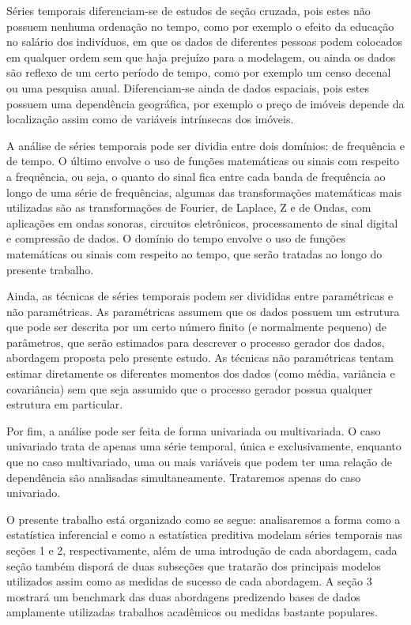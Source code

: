 \documentclass[twocolumn]{rbef}
\newcommand{\1}{\mathbbm{1}}
\begin{document}
Séries temporais diferenciam-se de estudos de seção cruzada, pois estes não possuem nenhuma ordenação no tempo, como por exemplo o efeito da educação no salário dos indivíduos, em que os dados de diferentes pessoas podem colocados em qualquer ordem sem que haja prejuízo para a modelagem, ou ainda os dados são reflexo de um certo período de tempo, como por exemplo um censo decenal ou uma pesquisa anual. Diferenciam-se ainda de dados espaciais, pois estes possuem uma dependência geográfica, por exemplo o preço de imóveis depende da localização assim como de variáveis intrínsecas dos imóveis.

A análise de séries temporais pode ser dividia entre dois domínios: de frequência e de tempo. O último envolve o uso de funções matemáticas  ou sinais com respeito a frequência, ou seja, o quanto do sinal fica entre cada banda de frequência ao longo de uma série de frequências, algumas das transformações matemáticas mais utilizadas são as transformações de Fourier, de Laplace, Z e de Ondas, com aplicações em ondas sonoras, circuitos eletrônicos, processamento de sinal digital e compressão de dados. O domínio do tempo envolve o uso de funções matemáticas ou sinais com respeito ao tempo, que serão tratadas ao longo do presente trabalho.

Ainda, as técnicas de séries temporais podem ser divididas entre paramétricas e não paramétricas. As paramétricas assumem que os dados possuem um estrutura que pode ser descrita por um certo número finito (e normalmente pequeno) de parâmetros, que serão estimados para descrever o processo gerador dos dados, abordagem proposta pelo presente estudo. As técnicas não paramétricas tentam estimar diretamente os diferentes momentos dos dados (como média, variância e covariância) sem que seja assumido que o processo gerador possua qualquer estrutura em particular.

Por fim, a análise pode ser feita de forma univariada ou multivariada. O caso univariado trata de apenas uma série temporal, única e exclusivamente, enquanto que no caso multivariado, uma ou mais variáveis que podem ter uma relação de dependência são analisadas simultaneamente. Trataremos apenas do caso univariado.


O presente trabalho está organizado como se segue: analisaremos a forma como a estatística inferencial e como a estatística preditiva modelam séries temporais nas seções 1 e 2, respectivamente, além de uma introdução de cada abordagem, cada seção também disporá de duas subseções que tratarão dos principais modelos utilizados assim como as medidas de sucesso de cada abordagem. A seção 3 mostrará um benchmark das duas abordagens predizendo bases de dados amplamente utilizadas trabalhos acadêmicos ou medidas bastante populares.
\end{document}
